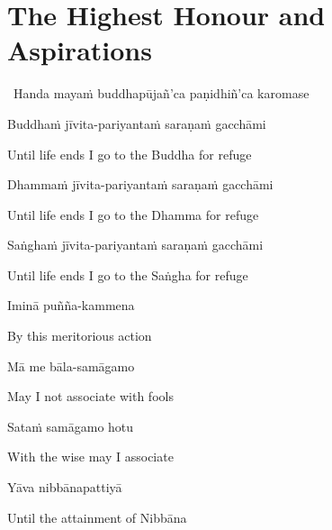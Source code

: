 \suttaRef{[MJG]}



\section{The Highest Honour and Aspirations}
\label{highest-honour-aspirations}

\begin{leader}
  \anglebracketleft\ \hspace{-0.5mm}Handa mayaṁ buddhapūjañ'ca paṇidhiñ'ca karomase \hspace{-0.5mm}\anglebracketright\
\end{leader}

Buddhaṁ jīvita-pariyantaṁ saraṇaṁ gacchāmi

\begin{english}
  Until life ends I go to the Buddha for refuge
\end{english}

Dhammaṁ jīvita-pariyantaṁ saraṇaṁ gacchāmi

\begin{english}
  Until life ends I go to the Dhamma for refuge
\end{english}

Saṅghaṁ jīvita-pariyantaṁ saraṇaṁ gacchāmi

\begin{english}
  Until life ends I go to the Saṅgha for refuge
\end{english}

Iminā puñña-kammena

\begin{english}
  By this meritorious action
\end{english}

Mā me bāla-samāgamo

\begin{english}
  May I not associate with fools
\end{english}

Sataṁ samāgamo hotu

\begin{english}
  With the wise may I associate
\end{english}

Yāva nibbānapattiyā

\begin{english}
  Until the attainment of Nibbāna
\end{english}

